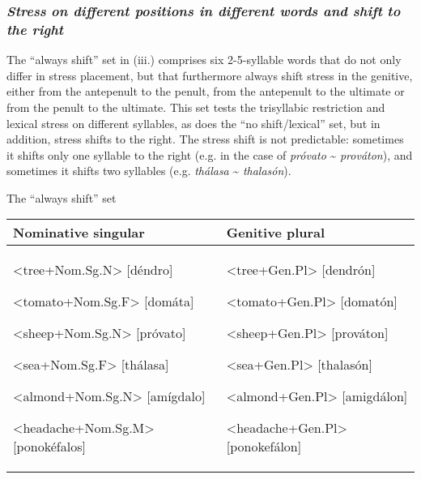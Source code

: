 \documentclass[a4paper]{article}
\begin{document}
\subsubsection{\textit{Stress}\textit{ on different positions in different words and shift}\textit{ to the right}}

The “always shift” set in (iii.) comprises six 2-5-syllable words that do not only differ in stress placement, but that furthermore always shift stress in the genitive, either from the antepenult to the penult, from the antepenult to the ultimate or from the penult to the ultimate. This set tests the trisyllabic restriction and lexical stress on different syllables, as does the “no shift/lexical” set, but in addition, stress shifts to the right. The stress shift is not predictable: sometimes it shifts only one syllable to the right (e.g. in the case of \textit{próvato} \~{} \textit{prováton}), and sometimes it shifts two syllables (e.g. \textit{thálasa} \~{} \textit{thalasón}).

\ea The “always shift” set

\begin{center}
\tablehead{}
\begin{supertabular}{m{2.68096in}|m{2.41706in}}
 Nominative singular &
 Genitive plural\\\hline
{ {\textless}tree+Nom.Sg.N{\textgreater} [déndro] \ \ }

{ {\textless}tomato+Nom.Sg.F{\textgreater} [domáta] }

{ {\textless}sheep+Nom.Sg.N{\textgreater} [próvato] }

{ {\textless}sea+Nom.Sg.F{\textgreater} [thálasa] }

{ {\textless}almond+Nom.Sg.N{\textgreater} [amígdalo] }

 {\textless}headache+Nom.Sg.M{\textgreater} [ponokéfalos]  &
{ {\textless}tree+Gen.Pl{\textgreater} [dendrón] \ \ }

{ {\textless}tomato+Gen.Pl{\textgreater} [domatón] }

{ {\textless}sheep+Gen.Pl{\textgreater} [prováton] }

{ {\textless}sea+Gen.Pl{\textgreater} [thalasón] }

{ {\textless}almond+Gen.Pl{\textgreater} [amigdálon] }

 {\textless}headache+Gen.Pl{\textgreater} [ponokefálon] \\
\end{supertabular}
\end{center}
\z
\end{document}
